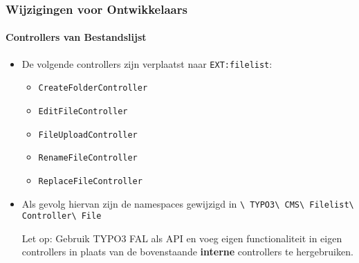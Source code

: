 
\begin{frame}[fragile]
	\frametitle{Wijzigingen voor Ontwikkelaars}
	\framesubtitle{Controllers van Bestandslijst}

	\begin{itemize}
		\item De volgende controllers zijn verplaatst naar \texttt{EXT:filelist}:

			\begin{itemize}\small
				\item \texttt{CreateFolderController}
				\item \texttt{EditFileController}
				\item \texttt{FileUploadController}
				\item \texttt{RenameFileController}
				\item \texttt{ReplaceFileController}
			\end{itemize}\normalsize

		\item Als gevolg hiervan zijn de namespaces gewijzigd in\newline
			\texttt{\textbackslash
				TYPO3\textbackslash
				CMS\textbackslash
				Filelist\textbackslash
				Controller\textbackslash
				File}

		\vspace{0.2cm}

		\small
			Let op: Gebruik TYPO3 FAL als API en voeg eigen functionaliteit
			in eigen controllers in plaats van de bovenstaande \textbf{interne}
			controllers te hergebruiken.
		\normalsize

	\end{itemize}

\end{frame}


